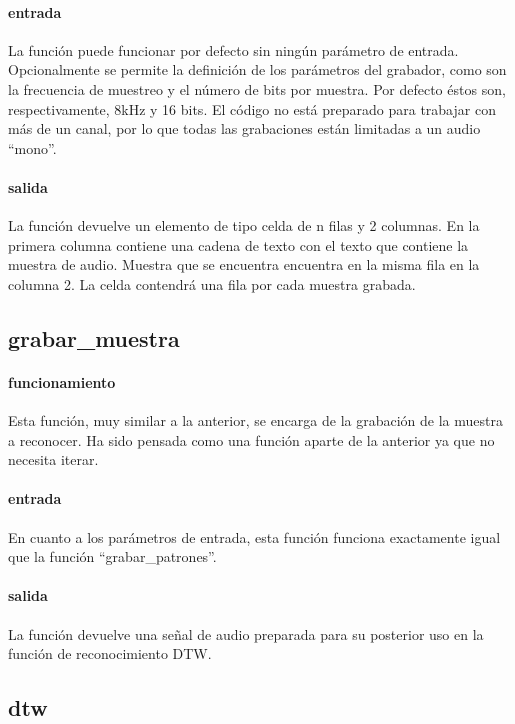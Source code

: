 \documentclass[10pt, a4paper]{article}
\begin{document}
\paragraph{entrada} La función puede funcionar por defecto sin ningún parámetro de entrada. Opcionalmente se permite la definición de los parámetros del grabador, como son la frecuencia de muestreo y el número de bits por muestra. Por defecto éstos son, respectivamente, 8kHz y 16 bits. El código no está preparado para trabajar con más de un canal, por lo que todas las grabaciones están limitadas a un audio ``mono''.

\paragraph{salida} La función devuelve un elemento de tipo celda de n filas y 2 columnas. En la primera columna contiene una cadena de texto con el texto que contiene la muestra de audio. Muestra que se encuentra encuentra en la misma fila en la columna 2. La celda contendrá una fila por cada muestra grabada.

\subsection*{grabar\_muestra}
\paragraph{funcionamiento} Esta función, muy similar a la anterior, se encarga de la grabación de la muestra a reconocer. Ha sido pensada como una función aparte de la anterior ya que no necesita iterar. 

\paragraph{entrada} En cuanto a los parámetros de entrada, esta función funciona exactamente igual que la función ``grabar\_patrones''.

\paragraph{salida} La función devuelve una señal de audio preparada para su posterior uso en la función de reconocimiento DTW.

\subsection*{dtw}
\end{document}
